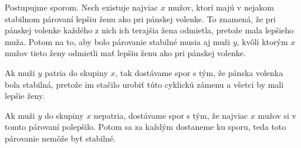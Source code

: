 
Postupujme sporom. Nech existuje najviac $x$ mužov, ktorí majú v nejakom 
stabilnom párovaní lepšiu ženu ako pri pánskej volenke. To znamená, že 
pri pánskej volenke každého z nich ich terajšia žena odmietla, pretože 
mala lepšieho muža. Potom na to, aby bolo párovanie stabilné musia aj 
muži $y$, kvôli ktorým $x$ mužov tieto ženy odmietli mať lepšiu ženu ako 
pri pánskej volenke. 

Ak muži $y$ patria do skupiny $x$, tak dostávame spor s tým, že pánska 
volenka bola stabilná, pretože im stačilo urobiť túto cyklickú zámenu 
a všetci by mali lepšie ženy. 

Ak muži $y$ do skupiny $x$ nepatria, dostávame spor s tým, že najviac 
$x$ mužov si v tomto párovaní polepšilo. Potom sa za každým dostaneme 
ku sporu, teda toto párovanie nemôže byť stabilné. 

